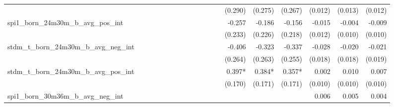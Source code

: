 \begin{tabular}{lrrrrrrrrrrrrrrrrrr}
                                            &              &              &              &              &              &              &              &              &               &              &              &               &      (0.290) &      (0.275) &       (0.267) &      (0.012) &      (0.013) &       (0.012) \\ 
spi1\_born\_24m30m\_b\_avg\_pos\_int        &              &              &              &              &              &              &              &              &               &              &              &               &       -0.257 &       -0.186 &        -0.156 &       -0.015 &       -0.004 &        -0.009 \\ 
                                            &              &              &              &              &              &              &              &              &               &              &              &               &      (0.233) &      (0.226) &       (0.218) &      (0.012) &      (0.010) &       (0.010) \\ 
stdm\_t\_born\_24m30m\_b\_avg\_neg\_int     &              &              &              &              &              &              &              &              &               &              &              &               &       -0.406 &       -0.323 &        -0.337 &       -0.028 &       -0.020 &        -0.021 \\ 
                                            &              &              &              &              &              &              &              &              &               &              &              &               &      (0.264) &      (0.263) &       (0.255) &      (0.018) &      (0.018) &       (0.019) \\ 
stdm\_t\_born\_24m30m\_b\_avg\_pos\_int     &              &              &              &              &              &              &              &              &               &              &              &               &       0.397* &       0.384* &        0.357* &        0.002 &        0.010 &         0.007 \\ 
                                            &              &              &              &              &              &              &              &              &               &              &              &               &      (0.170) &      (0.171) &       (0.171) &      (0.010) &      (0.010) &       (0.010) \\ 
spi1\_born\_30m36m\_b\_avg\_neg\_int        &              &              &              &              &              &              &              &              &               &              &              &               &              &              &               &        0.006 &        0.005 &         0.004 \\ 

\end{tabular}
